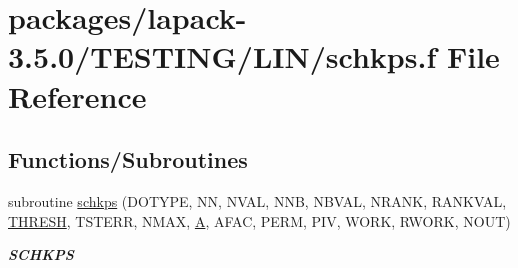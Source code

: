 \hypertarget{schkps_8f}{}\section{packages/lapack-\/3.5.0/\+T\+E\+S\+T\+I\+N\+G/\+L\+I\+N/schkps.f File Reference}
\label{schkps_8f}
\subsection*{Functions/\+Subroutines}
\begin{DoxyCompactItemize}
\item 
subroutine \hyperlink{group__single__lin_ga74880f8fbd9279596ab526f5380e3e09}{schkps} (D\+O\+T\+Y\+P\+E, N\+N, N\+V\+A\+L, N\+N\+B, N\+B\+V\+A\+L, N\+R\+A\+N\+K, R\+A\+N\+K\+V\+A\+L, \hyperlink{zlaqgs_8c_a0656018abfc9fa2821827415f5d5ea57}{T\+H\+R\+E\+S\+H}, T\+S\+T\+E\+R\+R, N\+M\+A\+X, \hyperlink{classA}{A}, A\+F\+A\+C, P\+E\+R\+M, P\+I\+V, W\+O\+R\+K, R\+W\+O\+R\+K, N\+O\+U\+T)
\begin{DoxyCompactList}\small\item\em {\bfseries S\+C\+H\+K\+P\+S} \end{DoxyCompactList}\end{DoxyCompactItemize}
